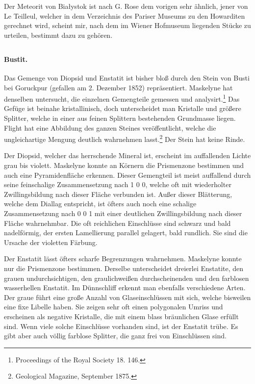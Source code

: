 \documentclass[a4paper, 12pt, oneside]{article}
\begin{document}
Der Meteorit von Białystok ist nach G. Rose dem vorigen sehr ähnlich, jener von Le Teilleul, welcher in dem Verzeichnis des Pariser Museums zu den Howarditen gerechnet wird, scheint mir, nach dem im Wiener Hofmuseum liegenden Stücke zu urteilen, bestimmt dazu zu gehören.
\clearpage
\subsection{}
\paragraph{Bustit.} Das Gemenge von Diopsid und Enstatit ist bisher bloß durch den Stein von Busti bei Goruckpur (gefallen am 2. Dezember 1852) repräsentiert. Maskelyne hat denselben untersucht, die einzelnen Gemengteile gemessen und analysirt.\footnote{Proceedings of the Royal Society 18. 146.} Das Gefüge ist beinahe kristallinisch, doch unterscheidet man Kristalle und größere Splitter, welche in einer aus feinen Splittern bestehenden Grundmasse liegen. Flight hat eine Abbildung des ganzen Steines veröffentlicht, welche die ungleichartige Mengung deutlich wahrnehmen lasst.\footnote{Geological Magazine, September 1875.} Der Stein hat keine Rinde.

Der Diopsid, welcher das herrschende Mineral ist, erscheint im auffallenden Lichte grau bis violett. Maskelyne konnte an Körnern die Prismenzone bestimmen und auch eine Pyramidenfläche erkennen. Dieser Gemengteil ist meist auffallend durch seine feinschalige Zusammensetzung nach 1 0 0, welche oft mit wiederholter Zwillingsbildung nach dieser Fläche verbunden ist. Außer dieser Blätterung, welche dem Diallag entspricht, ist öfters auch noch eine schalige Zusammensetzung nach 0 0 1 mit einer deutlichen Zwillingsbildung nach dieser Fläche wahrnehmbar. Die oft reichlichen Einschlüsse sind schwarz und bald nadelförmig, der ersten Lamellierung parallel gelagert, bald rundlich. Sie sind die Ursache der violetten Färbung.

Der Enstatit lässt öfters scharfe Begrenzungen wahrnehmen. Maskelyne konnte nur die Prismenzone bestimmen. Derselbe unterscheidet dreierlei Enstatite, den grauen undurchsichtigen, den graulichweißen durchscheinenden und den farblosen wasserhellen Enstatit. Im Dünnschliff erkennt man ebenfalls verschiedene Arten. Der graue führt eine große Anzahl von Glaseinschlüssen mit sich, welche bisweilen eine fixe Libelle haben. Sie zeigen sehr oft einen polygonalen Umriss und erscheinen als negative Kristalle, die mit einem blass bräunlichen Glase erfüllt sind. Wenn viele solche Einschlüsse vorhanden sind, ist der Enstatit trübe. Es gibt aber auch völlig farblose Splitter, die ganz frei von Einschlüssen sind.
\end{document}

